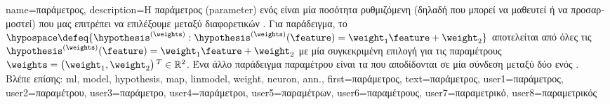 {name={\foreignlanguage{greek}{παράμετρος}},
	description={\foreignlanguage{greek}{Η παράμετρος} (parameter) 
		\foreignlanguage{greek}{ενός}   \foreignlanguage{greek}{είναι μία ποσότητα ρυθμιζόμενη 
		(δηλαδή που μπορεί να μαθευτεί ή να προσαρμοστεί) που μας επιτρέπει να επιλέξουμε μεταξύ διαφορετικών}  
		. \foreignlanguage{greek}{Για παράδειγμα, το}  
		$\hypospace \defeq \{\hypothesis^{(\weights)}: \hypothesis^{(\weights)}(\feature)= \weight_{1} \feature + \weight_{2}\}$  
		\foreignlanguage{greek}{αποτελείται από όλες τις}   
		$\hypothesis^{(\weights)}(\feature)= \weight_{1} \feature + \weight_{2}$  
		\foreignlanguage{greek}{με μία συγκεκριμένη επιλογή για τις παραμέτρους 
		$\weights = \big(\weight_{1},\weight_{2}\big)\,^{T} \in \mathbb{R}^{2}$. 
		Ένα άλλο παράδειγμα παραμέτρου}  \foreignlanguage{greek}{είναι τα}  
		\foreignlanguage{greek}{που αποδίδονται σε μία σύνδεση μεταξύ δύο}  \foreignlanguage{greek}{ενός} .
		\\
		\foreignlanguage{greek}{Βλέπε επίσης:} \gls{ml}, \gls{model}, \gls{hypothesis}, \gls{map}, \gls{linmodel}, \gls{weight}, \gls{neuron}, \gls{ann}.},
	first={\foreignlanguage{greek}{παράμετρος}},
	text={\foreignlanguage{greek}{παράμετρος}},
	user1={\foreignlanguage{greek}{παράμετρος}}, %
	user2={\foreignlanguage{greek}{παραμέτρου}}, %
	user3={\foreignlanguage{greek}{παράμετρο}}, %
	user4={\foreignlanguage{greek}{παράμετροι}}, %
	user5={\foreignlanguage{greek}{παραμέτρων}}, %
	user6={\foreignlanguage{greek}{παραμέτρους}}, %
	user7={\foreignlanguage{greek}{παραμετρικό}}, %
	user8={\foreignlanguage{greek}{παραμετρικός}} %
}

